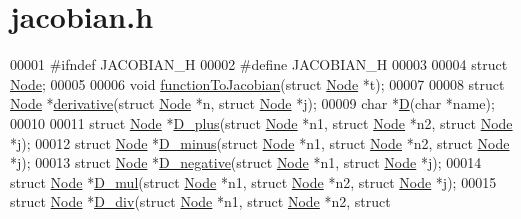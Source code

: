\hypertarget{jacobian_8h_source}{\section{jacobian.\-h}
}

\begin{DoxyCode}
00001 \textcolor{preprocessor}{#ifndef JACOBIAN\_H}
00002 \textcolor{preprocessor}{}\textcolor{preprocessor}{#define JACOBIAN\_H}
00003 \textcolor{preprocessor}{}
00004 \textcolor{keyword}{struct }\hyperlink{structNode}{Node};
00005 
00006 \textcolor{keywordtype}{void} \hyperlink{jacobian_8c_a63b2497734bd2aea0c2648ee592913ae}{functionToJacobian}(\textcolor{keyword}{struct} \hyperlink{structNode}{Node} *t);
00007 
00008 \textcolor{keyword}{struct }\hyperlink{structNode}{Node} *\hyperlink{jacobian_8c_a679e6863209bf428a60f209b8ac64b2f}{derivative}(\textcolor{keyword}{struct} \hyperlink{structNode}{Node} *n, \textcolor{keyword}{struct} \hyperlink{structNode}{Node} *j);
00009 \textcolor{keywordtype}{char} *\hyperlink{jacobian_8c_a21d0cae9ba0f71cac6989332790340a4}{D}(\textcolor{keywordtype}{char} *name);
00010 
00011 \textcolor{keyword}{struct }\hyperlink{structNode}{Node} *\hyperlink{jacobian_8c_a7709640e1a5d9fdbe4b02d07e1389848}{D\_plus}(\textcolor{keyword}{struct} \hyperlink{structNode}{Node} *n1, \textcolor{keyword}{struct} \hyperlink{structNode}{Node} *n2, \textcolor{keyword}{struct} 
      \hyperlink{structNode}{Node} *j);
00012 \textcolor{keyword}{struct }\hyperlink{structNode}{Node} *\hyperlink{jacobian_8c_a18e1538e30dfe1e4d675c9ae7e090912}{D\_minus}(\textcolor{keyword}{struct} \hyperlink{structNode}{Node} *n1, \textcolor{keyword}{struct} \hyperlink{structNode}{Node} *n2, \textcolor{keyword}{struct} 
      \hyperlink{structNode}{Node} *j);
00013 \textcolor{keyword}{struct }\hyperlink{structNode}{Node} *\hyperlink{jacobian_8c_aabf319e76dcbd7f0f8135daea08130fb}{D\_negative}(\textcolor{keyword}{struct} \hyperlink{structNode}{Node} *n1, \textcolor{keyword}{struct} \hyperlink{structNode}{Node} *j);
00014 \textcolor{keyword}{struct }\hyperlink{structNode}{Node} *\hyperlink{jacobian_8c_a563b2d2ddf25802728e25a796247e051}{D\_mul}(\textcolor{keyword}{struct} \hyperlink{structNode}{Node} *n1, \textcolor{keyword}{struct} \hyperlink{structNode}{Node} *n2, \textcolor{keyword}{struct} 
      \hyperlink{structNode}{Node} *j);
00015 \textcolor{keyword}{struct }\hyperlink{structNode}{Node} *\hyperlink{jacobian_8c_a7a5c37c4ee6200ad5b2ed80f44594f7d}{D\_div}(\textcolor{keyword}{struct} \hyperlink{structNode}{Node} *n1, \textcolor{keyword}{struct} \hyperlink{structNode}{Node} *n2, \textcolor{keyword}{struct} 

\end{DoxyCode}
